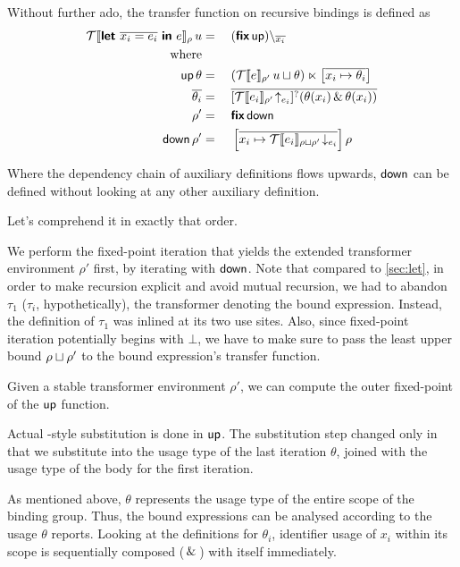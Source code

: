 Without further ado, the transfer function on recursive bindings is defined as
\begin{alignat*}{2}
  \transfer{\sLet{\binds}{e}}{\rho}\,u &{}={}&& (\fix\,\up) \setminus_{\overline{x_i}} \\
  \text{where} \\
   \up\,\theta &{}={}&& \cmblet{(\transfer{e}{\rho'}\,u \llub \theta)}{\maplit[\overline]{x_i}{\theta_i}} \\
   \overline{\theta_i} &{}={}&& \overline{\liftqm{\letup{\transfer{e_i}{\rho'}}{e_i}}{(\theta(x_i) \both \theta(x_i))}} \\
   \rho' &{}={}&& \fix\,\down \\
   \down\,\rho' &{}={}&& \maplit[\overline]{x_i}{\letdown{\transfer{e_i}{\rho \llub \rho'}}{e_i}}\rho \\ 
\end{alignat*}

Where the dependency chain of auxiliary definitions flows upwards, \eg $\down$ can be defined without looking at any other auxiliary definition.

Let's comprehend it in exactly that order.

We perform the fixed-point iteration that yields the extended transformer environment $\rho'$ first, by iterating with $\down$.
Note that compared to \cref{sec:let}, in order to make recursion explicit and avoid mutual recursion, we had to abandon $\tau_1$ ($\tau_i$, hypothetically), the transformer denoting the bound expression.
Instead, the definition of $\tau_1$ was inlined at its two use sites.
Also, since fixed-point iteration potentially begins with $\bot$, we have to make sure to pass the least upper bound $\rho \llub \rho'$ to the bound expression's transfer function.

Given a stable transformer environment $\rho'$, we can compute the outer fixed-point of the $\up$ function.

Actual -style substitution is done in $\up$.
The substitution step changed only in that we substitute into the usage type of the last iteration $\theta$, joined with the usage type of the body for the first iteration.

As mentioned above, $\theta$ represents the usage type of the entire scope of the binding group.
Thus, the bound expressions can be analysed according to the usage $\theta$ reports.
Looking at the definitions for $\theta_i$, identifier usage of $x_i$ within its scope is sequentially composed ($\both$) with itself immediately.

